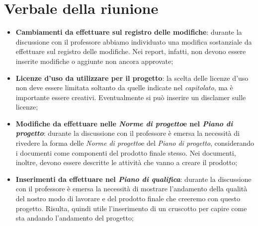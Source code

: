 \section{Verbale della riunione}
	\begin{itemize}
		\item \textbf{Cambiamenti da effettuare sul registro delle modifiche}: durante la discussione con il professore abbiamo individuato una modifica sostanziale da effettuare sul registro delle modifiche. Nei report, infatti, non devono essere inserite modifiche o aggiunte non ancora approvate;%
		\item \textbf{Licenze d'uso da utilizzare per il progetto}: la scelta delle licenze d'uso non deve essere limitata soltanto da quelle indicate nel \textit{capitolato}\glos, ma è importante essere creativi. Eventualmente si può inserire un disclamer sulle licenze;
		\item \textbf{Modifiche da effettuare nelle \textit{Norme di progetto}\doc e nel \textit{Piano di progetto}\docs}: durante la discussione con il professore è emersa la necessità di rivedere la forma delle \textit{Norme di progetto}\doc e del \textit{Piano di progetto}\docs, considerando i documenti come componenti del prodotto finale stesso. Nei documenti, inoltre, devono essere descritte le attività che vanno a creare il prodotto;
		\item \textbf{Inserimenti da effettuare nel \textit{Piano di qualifica}\docs}: durante la discussione con il professore è emersa la necessità di mostrare l'andamento della qualità del nostro modo di lavorare e del prodotto finale che creeremo con questo progetto. Risulta, quindi utile l'inserimento di un cruscotto per capire come sta andando l'andamento del progetto;
	\end{itemize}